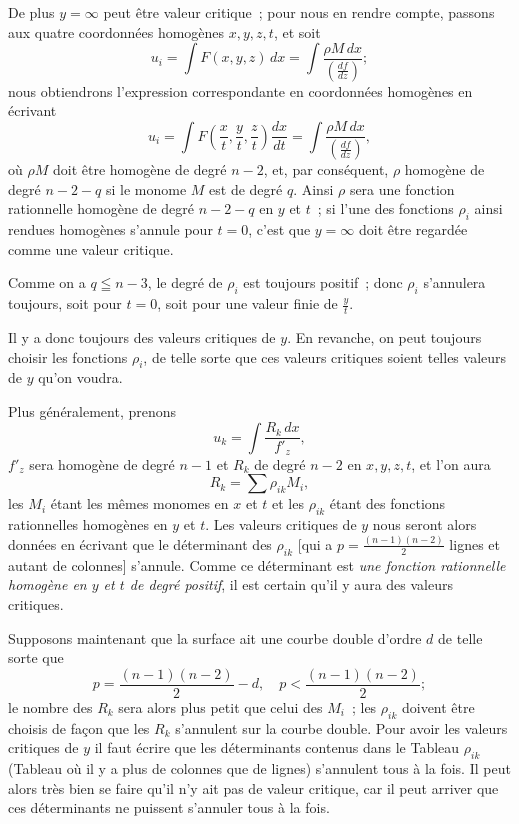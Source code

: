 \documentclass{article}
\begin{document}
De plus $y = \infty$ peut être valeur critique~; pour nous en rendre compte, passons aux quatre coordonnées homogènes $x, y, z, t$, et soit
\[
u_{i} = \int F(x, y, z) \,dx = \int \frac{\rho M \,dx}{\left(\frac{df}{dz}\right)};
\]
nous obtiendrons l'expression correspondante en coordonnées homogènes en écrivant
\[
u_{i} = \int F\left(\frac{x}{t}, \frac{y}{t}, \frac{z}{t}\right) \frac{dx}{dt} = \int \frac{\rho M \,dx}{\left(\frac{df}{dz}\right)},
\]
où $\rho M$ doit être homogène de degré $n - 2$, et, par conséquent, $\rho$ homogène de degré $n - 2 - q$ si le monome $M$ est de degré $q$. Ainsi $\rho$ sera une fonction rationnelle homogène de degré $n - 2 - q$ en $y$ et $t$~; si l'une des fonctions $\rho_{i}$ ainsi rendues homogènes s'annule pour $t = 0$, c'est que $y = \infty$ doit être regardée comme une valeur critique.

Comme on a $q \leqq n - 3$, le degré de $\rho_{i}$ est toujours positif~; donc $\rho_{i}$ s'annulera toujours, soit pour $t = 0$, soit pour une valeur finie de $\frac{y}{t}$.

Il y a donc toujours des valeurs critiques de $y$. En revanche, on peut toujours choisir les fonctions $\rho_{i}$, de telle sorte que ces valeurs critiques soient telles valeurs de $y$ qu'on voudra.

Plus généralement, prenons
\[
u_{k} = \int \frac{R_{k} \,dx}{f'_{z}},
\]
$f'_{z}$ sera homogène de degré $n - 1$ et $R_{k}$ de degré $n - 2$ en $x, y, z, t$, et l'on aura
\[
R_{k} = \sum \rho_{ik} M_{i},
\]
les $M_{i}$ étant les mêmes monomes en $x$ et $t$ et les $\rho_{ik}$ étant des fonctions rationnelles homogènes en $y$ et $t$. Les valeurs critiques de $y$ nous seront alors données en écrivant que le déterminant des $\rho_{ik}$ [qui a $p = \frac{(n - 1)(n - 2)}{2}$ lignes et autant de colonnes] s'annule. Comme ce déterminant est \emph{une fonction rationnelle homogène en $y$ et $t$ de degré positif}, il est certain qu'il y aura des valeurs critiques.

Supposons maintenant que la surface ait une courbe double d'ordre $d$ de telle sorte que
\[
p = \frac{(n - 1)(n - 2)}{2} - d, \quad p < \frac{(n - 1)(n - 2)}{2};
\]
le nombre des $R_{k}$ sera alors plus petit que celui des $M_{i}$~; les $\rho_{ik}$ doivent être choisis de façon que les $R_{k}$ s'annulent sur la courbe double. Pour avoir les valeurs critiques de $y$ il faut écrire que les déterminants contenus dans le Tableau $\rho_{ik}$ (Tableau où il y a plus de colonnes que de lignes) s'annulent tous à la fois. Il peut alors très bien se faire qu'il n'y ait pas de valeur critique, car il peut arriver que ces déterminants ne puissent s'annuler tous à la fois.
\end{document}
